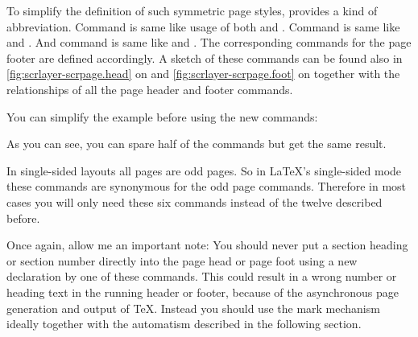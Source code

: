 To simplify the definition of such symmetric page styles,
 provides a kind of abbreviation. Command
 is same like usage of both  and
. Command  is same like  and
. And command  is same like  and
. The corresponding commands for the page footer are defined
accordingly. A sketch of these commands can be found also in
\autoref{fig:scrlayer-scrpage.head} on 
and \autoref{fig:scrlayer-scrpage.foot} on
 together with the relationships of all
the page header and footer commands.
%
\begin{Example}
  You can simplify the example before using the new commands:
  As you can see, you can spare half of the commands but get the same result.
\end{Example}
%
In single-sided layouts all pages are odd pages. So in LaTeX's single-sided
mode these commands are synonymous for the odd page commands. Therefore in
most cases you will only need these six commands instead of the twelve
described before.

Once again, allow me an important note: You should never
put a section heading or section number directly into the page head or
page foot using a new declaration by one of these commands. This could result in
a wrong number or heading text in the running header or footer, because of the
asynchronous page generation and output of \TeX. Instead you should use the
mark mechanism ideally together with the automatism described in the following
section.%
%
%
%
%
%
%

